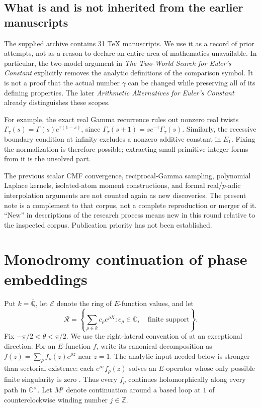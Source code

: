 \documentclass[11pt,a4paper]{article}
\theoremstyle{definition}
\theoremstyle{remark}
\numberwithin{equation}{section}
\begin{document}
\subsection{What is and is not inherited from the earlier manuscripts}
The supplied archive contains 31 TeX manuscripts. We use it as a
record of prior attempts, not as a reason to declare an entire area
of mathematics unavailable. In particular, the two-model argument
in \emph{The Two-World Search for Euler's Constant} explicitly removes
the analytic definitions of the comparison symbol. It is not a proof
that the actual number $\gamma$ can be changed while preserving all
of its defining properties. The later \emph{Arithmetic Alternatives
for Euler's Constant} already distinguishes these scopes.

For example, the exact real Gamma recurrence rules out nonzero real
twists $\Gamma_\tau(s)=\Gamma(s)e^{\tau(1-s)}$, since
$\Gamma_\tau(s+1)=se^{-\tau}\Gamma_\tau(s)$. Similarly, the recessive
boundary condition at infinity excludes a nonzero additive constant
in $E_1$. Fixing the normalization is therefore possible; extracting
small primitive integer forms from it is the unsolved part.

The previous scalar CMF convergence, reciprocal-Gamma sampling,
polynomial Laplace kernels, isolated-atom moment constructions, and
formal real/$p$-adic interpolation arguments are not counted again
as new discoveries. The present note is a complement to that corpus,
not a complete reproduction or merger of it. ``New'' in descriptions
of the research process means new in this round relative to the
inspected corpus. Publication priority has not been established.


\section{Monodromy continuation of phase embeddings}
\label{p5:pm:section}

Put $k=\overline{\mathbb Q}$, let $\mathcal E$ denote the ring of
$E$-function values, and let
\[
 \mathcal R=\left\{\sum_{\rho\in k}c_\rho e^{\rho X}:
        c_\rho\in\mathbb C,\quad\text{finite support}\right\}.
\]
Fix $-\pi/2<\theta<\pi/2$.  We use the right-lateral convention
of \cite[Proposition~3.1]{p5:FischlerRivoal2026Units} at an exceptional
direction.  For an $E$-function $f$, write its canonical decomposition
as $f(z)=\sum_\rho f_\rho(z)e^{\rho z}$ near $z=1$.
The analytic input needed below is stronger than sectorial existence:
each $e^{\rho z}f_\rho(z)$ solves an $E$-operator whose only possible
finite singularity is zero
\cite[\S2, immediately before Theorem~2.3]{p5:FischlerRivoal2026Units}.
Thus every $f_\rho$ continues holomorphically along every path in
$\mathbb C^\times$.  Let $M^j$ denote continuation around a based
loop at $1$ of counterclockwise winding number $j\in\mathbb Z$.
\end{document}
